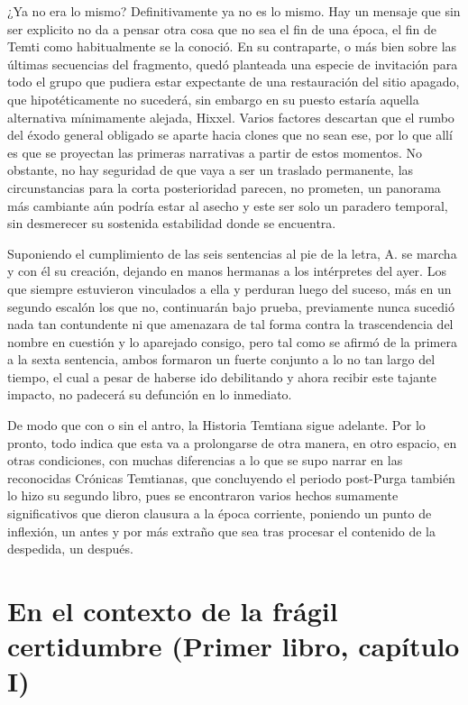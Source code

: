 \documentclass[
]{book}
\begin{document}
¿Ya no era lo mismo? Definitivamente ya no es lo mismo. Hay un mensaje que sin ser explicito no da a pensar otra cosa que no sea el fin de una época, el fin de Temti como habitualmente se la conoció. En su contraparte, o más bien sobre las últimas secuencias del fragmento, quedó planteada una especie de invitación para todo el grupo que pudiera estar expectante de una restauración del sitio apagado, que hipotéticamente no sucederá, sin embargo en su puesto estaría aquella alternativa mínimamente alejada, Hixxel. Varios factores descartan que el rumbo del éxodo general obligado se aparte hacia clones que no sean ese, por lo que allí es que se proyectan las primeras narrativas a partir de estos momentos. No obstante, no hay seguridad de que vaya a ser un traslado permanente, las circunstancias para la corta posterioridad parecen, no prometen, un panorama más cambiante aún podría estar al asecho y este ser solo un paradero temporal, sin desmerecer su sostenida estabilidad donde se encuentra.

Suponiendo el cumplimiento de las seis sentencias al pie de la letra, A. se marcha y con él su creación, dejando en manos hermanas a los intérpretes del ayer. Los que siempre estuvieron vinculados a ella y perduran luego del suceso, más en un segundo escalón los que no, continuarán bajo prueba, previamente nunca sucedió nada tan contundente ni que amenazara de tal forma contra la trascendencia del nombre en cuestión y lo aparejado consigo, pero tal como se afirmó de la primera a la sexta sentencia, ambos formaron un fuerte conjunto a lo no tan largo del tiempo, el cual a pesar de haberse ido debilitando y ahora recibir este tajante impacto, no padecerá su defunción en lo inmediato.

De modo que con o sin el antro, la Historia Temtiana sigue adelante. Por lo pronto, todo indica que esta va a prolongarse de otra manera, en otro espacio, en otras condiciones, con muchas diferencias a lo que se supo narrar en las reconocidas Crónicas Temtianas, que concluyendo el periodo post-Purga también lo hizo su segundo libro, pues se encontraron varios hechos sumamente significativos que dieron clausura a la época corriente, poniendo un punto de inflexión, un antes y por más extraño que sea tras procesar el contenido de la despedida, un después.

\hypertarget{en-el-contexto-de-la-fruxe1gil-certidumbre-primer-libro-capuxedtulo-i}{%
\section{En el contexto de la frágil certidumbre (Primer libro, capítulo I)}\label{en-el-contexto-de-la-fruxe1gil-certidumbre-primer-libro-capuxedtulo-i}}
\end{document}
